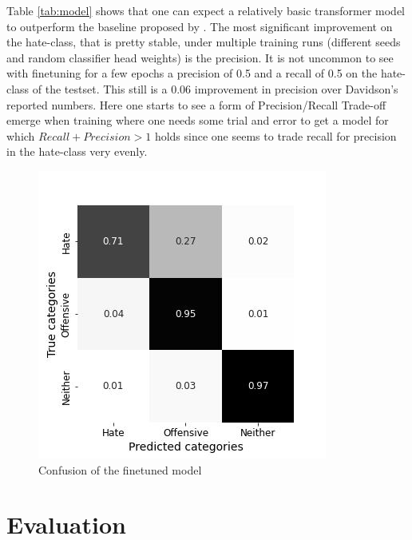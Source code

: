 \documentclass[11pt,a4paper]{article}
\begin{document}
Table \ref{tab:model} shows that one can expect a relatively basic transformer model to outperform the baseline proposed by \cite{auto_hatespeech}.
The most significant improvement on the hate-class, that is pretty stable, under multiple training runs (different seeds and random classifier head weights)
is the precision. It is not uncommon to see with finetuning for a few epochs a precision of 0.5 and a recall of 0.5 on the hate-class of the testset.
This still is a 0.06 improvement in precision over Davidson's reported numbers.
Here one starts to see a form of Precision/Recall Trade-off emerge when training where one needs some trial and error to get a model for which 
$ Recall + Precision > 1 $ holds since one seems to trade recall for precision in the hate-class very evenly.
\begin{figure}[h]
 \includegraphics[width=\linewidth]{./tables-figures/model_confusion.jpg}
  \caption{Confusion of the finetuned model}
  \label{fig:model_confusion}
\end{figure}

\section{Evaluation}
\end{document}
